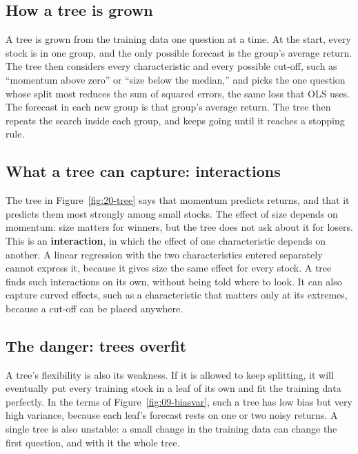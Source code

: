 \subsection{How a tree is grown}

A tree is grown from the training data one question at a time. At the start, every stock is in one group, and the only possible forecast is the group's average return. The tree then considers every characteristic and every possible cut-off, such as ``momentum above zero'' or ``size below the median,'' and picks the one question whose split most reduces the sum of squared errors, the same loss that OLS uses. The forecast in each new group is that group's average return. The tree then repeats the search inside each group, and keeps going until it reaches a stopping rule.

\subsection{What a tree can capture: interactions}

The tree in Figure~\ref{fig:20-tree} says that momentum predicts returns, and that it predicts them most strongly among small stocks. The effect of size depends on momentum: size matters for winners, but the tree does not ask about it for losers. This is an \textbf{interaction}, in which the effect of one characteristic depends on another. A linear regression with the two characteristics entered separately cannot express it, because it gives size the same effect for every stock. A tree finds such interactions on its own, without being told where to look. It can also capture curved effects, such as a characteristic that matters only at its extremes, because a cut-off can be placed anywhere.

\subsection{The danger: trees overfit}

A tree's flexibility is also its weakness. If it is allowed to keep splitting, it will eventually put every training stock in a leaf of its own and fit the training data perfectly. In the terms of Figure~\ref{fig:09-biasvar}, such a tree has low bias but very high variance, because each leaf's forecast rests on one or two noisy returns. A single tree is also unstable: a small change in the training data can change the first question, and with it the whole tree.


